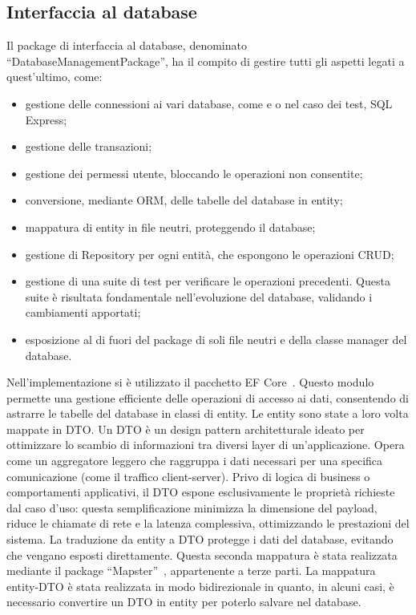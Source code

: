 \subsection{Interfaccia al database}
Il package di interfaccia al database, denominato ``DatabaseManagementPackage'',
ha il compito di gestire tutti gli aspetti legati a quest'ultimo, come:
\begin{itemize}
    \item gestione delle connessioni ai vari database, come \sqlite{} e \sqlserver{} o nel caso dei test, SQL Express;
    \item gestione delle transazioni;
    \item gestione dei permessi utente, bloccando le operazioni non consentite;
    \item conversione, mediante \ac{ORM}, delle tabelle del database in entity;
    \item mappatura di entity in file neutri, proteggendo il database;
    \item gestione di Repository per ogni entità, che espongono le operazioni \ac{CRUD};
    \item gestione di una suite di test per verificare le operazioni precedenti.
          Questa suite è risultata fondamentale nell'evoluzione del database,
          validando i cambiamenti apportati;
    \item esposizione al di fuori del package di soli file neutri e della classe manager del database.
\end{itemize}
Nell'implementazione si è utilizzato il pacchetto \nuget{} \ac{EF Core}~\cite{EFCore}.
Questo modulo permette una gestione efficiente delle operazioni di accesso ai dati,
consentendo di astrarre le tabelle del database in classi di entity.
Le entity sono state a loro volta mappate in \ac{DTO}.
Un \ac{DTO} è un design pattern architetturale ideato
per ottimizzare lo scambio di informazioni tra diversi layer di un'applicazione.
Opera come un aggregatore leggero che raggruppa i dati necessari
per una specifica comunicazione (come il traffico client-server).
Privo di logica di business o comportamenti applicativi, il \ac{DTO}
espone esclusivamente le proprietà richieste dal caso d'uso:
questa semplificazione minimizza la dimensione del payload,
riduce le chiamate di rete e la latenza complessiva, ottimizzando le prestazioni del sistema.
La traduzione da entity a \ac{DTO} protegge i dati del database, evitando che vengano esposti direttamente\cite{DTO}.
Questa seconda mappatura è stata realizzata mediante il package ``Mapster''~\cite{Mapster},
appartenente a terze parti.
La mappatura entity-\ac{DTO} è stata realizzata in modo bidirezionale in quanto, in alcuni casi,
è necessario convertire un \ac{DTO} in entity per poterlo salvare nel database.

